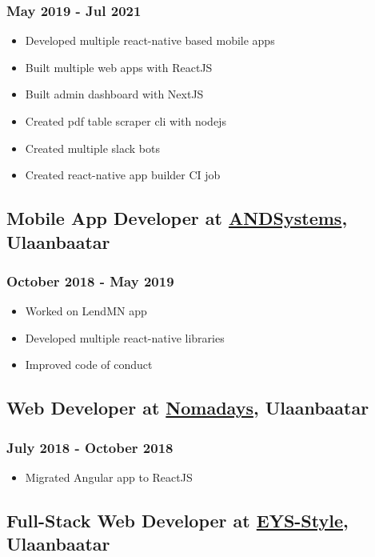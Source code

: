 \documentclass[a4]{article}
\begin{document}
\subsubsection{May 2019 - Jul 2021}
\label{sec:org5df07ee}
\begin{itemize}
\item Developed multiple react-native based mobile apps
\item Built multiple web apps with ReactJS
\item Built admin dashboard with NextJS
\item Created pdf table scraper cli with nodejs
\item Created multiple slack bots
\item Created react-native app builder CI job
\end{itemize}
\subsection{Mobile App Developer at \href{https://andsystems.net}{ANDSystems}, Ulaanbaatar}
\label{sec:org997ab61}
\subsubsection{October 2018 - May 2019}
\label{sec:orge89463e}
\begin{itemize}
\item Worked on LendMN app
\item Developed multiple react-native libraries
\item Improved code of conduct
\end{itemize}
\subsection{Web Developer at \href{https:nomadays.com}{Nomadays}, Ulaanbaatar}
\label{sec:orgddf9211}
\subsubsection{July 2018 - October 2018}
\label{sec:org373d6cb}
\begin{itemize}
\item Migrated Angular app to ReactJS
\end{itemize}
\subsection{Full-Stack Web Developer at \href{http:www.eys-style.com}{EYS-Style}, Ulaanbaatar}
\label{sec:orgae1c743}
\end{document}
